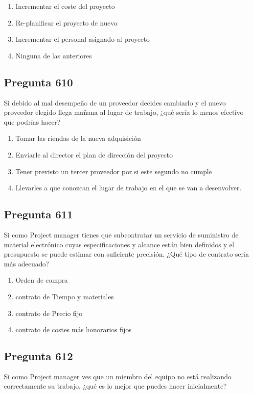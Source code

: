 \documentclass[11pt,a4paper]{article}
\begin{document}
\begin{enumerate}[label=\alph*)]
  \item Incrementar el coste del proyecto
  \item Re-planificar el proyecto de nuevo
  \item Incrementar el personal asignado al proyecto
  \item Ninguna de las anteriores
\end{enumerate}

\subsection*{Pregunta 610}
Si debido al mal desempeño de un proveedor decides cambiarlo y el nuevo proveedor elegido llega mañana al lugar de trabajo, ¿qué sería lo menos efectivo que podrías hacer?

\begin{enumerate}[label=\alph*)]
  \item Tomar las riendas de la nueva adquisición
  \item Enviarle al director el plan de dirección del proyecto
  \item Tener previsto un tercer proveedor por si este segundo no cumple
  \item Llevarles a que conozcan el lugar de trabajo en el que se van a desenvolver.
\end{enumerate}

\subsection*{Pregunta 611}
Si como Project manager tienes que subcontratar un servicio de suministro de material electrónico cuyas especificaciones y alcance están bien definidos y el presupuesto se puede estimar con suficiente precisión. ¿Qué tipo de contrato sería más adecuado?

\begin{enumerate}[label=\alph*)]
  \item Orden de compra
  \item contrato de Tiempo y materiales
  \item contrato de Precio fijo
  \item contrato de costes más honorarios fijos
\end{enumerate}

\subsection*{Pregunta 612}
Si como Project manager ves que un miembro del equipo no está realizando correctamente su trabajo, ¿qué es lo mejor que puedes hacer inicialmente?
\end{document}
